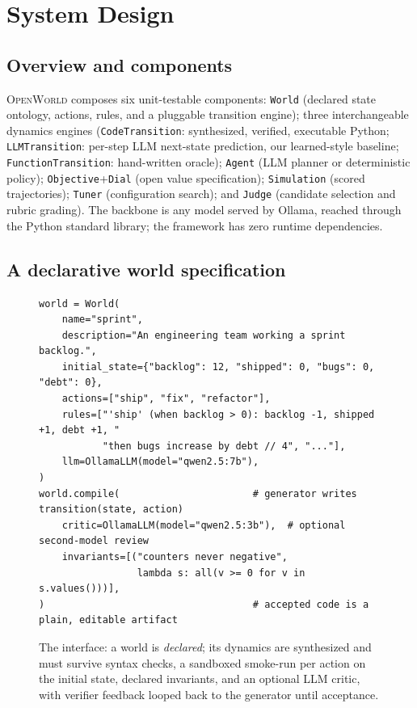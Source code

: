\documentclass[11pt]{article}
\newcommand{\openworld}{\textsc{OpenWorld}}
\begin{document}
\section{System Design}
\subsection{Overview and components}
\openworld{} composes six unit-testable components: \texttt{World} (declared
state ontology, actions, rules, and a pluggable transition engine); three
interchangeable dynamics engines (\texttt{CodeTransition}: synthesized,
verified, executable Python; \texttt{LLMTransition}: per-step LLM next-state
prediction, our learned-style baseline; \texttt{FunctionTransition}:
hand-written oracle); \texttt{Agent} (LLM planner or deterministic policy);
\texttt{Objective}+\texttt{Dial} (open value specification);
\texttt{Simulation} (scored trajectories); \texttt{Tuner} (configuration
search); and \texttt{Judge} (candidate selection and rubric grading). The
backbone is any model served by Ollama, reached through the Python standard
library; the framework has zero runtime dependencies.

\subsection{A declarative world specification}\label{sec:language}
\begin{figure}[htb]\centering
\begin{tcolorbox}[policycard, cardcol=cardblue,
  title=A world declaration and its verified compilation, width=0.94\linewidth]
\begin{lstlisting}[style=housespecyamlbare]
world = World(
    name="sprint",
    description="An engineering team working a sprint backlog.",
    initial_state={"backlog": 12, "shipped": 0, "bugs": 0, "debt": 0},
    actions=["ship", "fix", "refactor"],
    rules=["'ship' (when backlog > 0): backlog -1, shipped +1, debt +1, "
           "then bugs increase by debt // 4", "..."],
    llm=OllamaLLM(model="qwen2.5:7b"),
)
world.compile(                       # generator writes transition(state, action)
    critic=OllamaLLM(model="qwen2.5:3b"),  # optional second-model review
    invariants=[("counters never negative",
                 lambda s: all(v >= 0 for v in s.values()))],
)                                    # accepted code is a plain, editable artifact
\end{lstlisting}
\end{tcolorbox}
\caption{The interface: a world is \emph{declared}; its dynamics are
synthesized and must survive syntax checks, a sandboxed smoke-run per action
on the initial state, declared invariants, and an optional LLM critic, with
verifier feedback looped back to the generator until acceptance.}
\label{fig:spec}
\end{figure}
\end{document}
